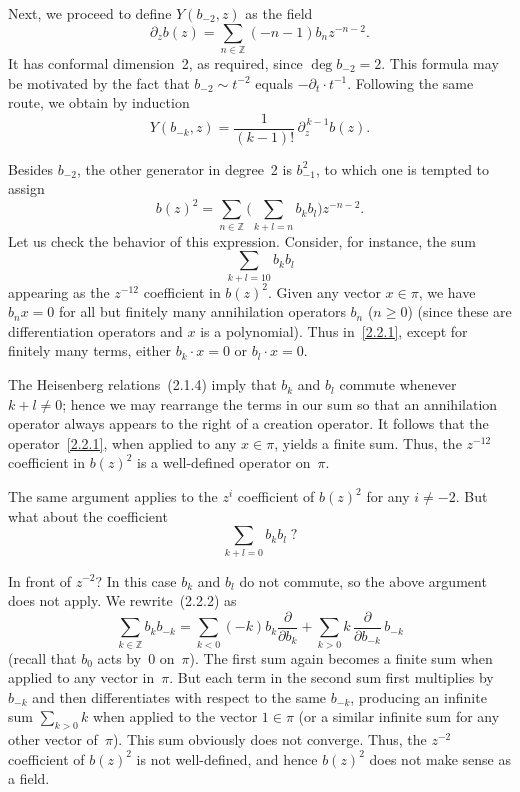 \documentclass[12pt]{article}
\begin{document}
\medskip

Next, we proceed to define $Y(b_{-2}, z)$ as the field
\[
    \partial_z b(z)
    = \sum_{n\in\mathbb{Z}} (-n-1) b_n z^{-n-2}.
\]
It has conformal dimension~2, as required, since $\deg b_{-2} = 2$.
This formula may be motivated by the fact that $b_{-2} \sim t^{-2}$ equals $-\partial_t \cdot t^{-1}$.
Following the same route, we obtain by induction
\[
    Y(b_{-k}, z)
    = \frac{1}{(k-1)!}\,\partial_z^{\,k-1} b(z).
\]

Besides $b_{-2}$, the other generator in degree~2 is $b_{-1}^2$, to which one is tempted to assign
\[
    b(z)^2
    = \sum_{n\in\mathbb{Z}} \bigg(\sum_{k+l=n} b_k b_l\bigg) z^{-n-2}.
\]
Let us check the behavior of this expression.
Consider, for instance, the sum
\begin{equation}\label{2.2.1}
    \sum_{k+l=10} b_k b_l
\end{equation}
appearing as the $z^{-12}$ coefficient in $b(z)^2$.
Given any vector $x\in\pi$, we have $b_n x = 0$ for all but finitely many annihilation operators $b_n$ ($n\ge 0$)
(since these are differentiation operators and $x$ is a polynomial).
Thus in~\eqref{2.2.1}, except for finitely many terms, either $b_k\cdot x = 0$ or $b_l\cdot x = 0$.

\medskip

The Heisenberg relations~(2.1.4) imply that $b_k$ and $b_l$ commute whenever $k+l\ne 0$;
hence we may rearrange the terms in our sum so that an annihilation operator always appears to the right of a creation operator.
It follows that the operator~\eqref{2.2.1}, when applied to any $x\in\pi$, yields a finite sum.
Thus, the $z^{-12}$ coefficient in $b(z)^2$ is a well-defined operator on~$\pi$.

\medskip

The same argument applies to the $z^i$ coefficient of $b(z)^2$ for any $i\ne -2$.
But what about the coefficient
\begin{equation}\label{2.2.2}
    \sum_{k+l=0} b_k b_l\; ?
\end{equation}

In front of $z^{-2}$? In this case $b_k$ and $b_l$ do not commute, so the above argument does not apply.
We rewrite~(2.2.2) as
\[
    \sum_{k\in\mathbb{Z}} b_k b_{-k}
    = \sum_{k<0} (-k)b_k \frac{\partial}{\partial b_k}
    + \sum_{k>0} k\,\frac{\partial}{\partial b_{-k}}\,b_{-k}
\]
(recall that $b_0$ acts by~0 on~$\pi$).
The first sum again becomes a finite sum when applied to any vector in~$\pi$.
But each term in the second sum first multiplies by $b_{-k}$ and then differentiates with respect to the same $b_{-k}$, producing an infinite sum
$\sum_{k>0} k$ when applied to the vector $1\in\pi$ (or a similar infinite sum for any other vector of~$\pi$).
This sum obviously does not converge.
Thus, the $z^{-2}$ coefficient of $b(z)^2$ is not well-defined, and hence $b(z)^2$ does not make sense as a field.
\end{document}
